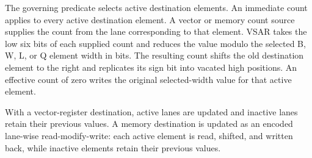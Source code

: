 The governing predicate selects active destination elements. An immediate
count applies to every active destination element. A vector or
memory count source supplies the count from the lane corresponding to that
element. VSAR takes the low six bits of each supplied count and reduces the
value modulo the selected B, W, L, or Q element width in bits. The resulting
count shifts the old destination element to the right and replicates its sign
bit into vacated high positions. An effective count of zero writes the original
selected-width value for that active element.

With a vector-register destination, active lanes are updated and inactive lanes
retain their previous values. A memory destination is updated as an encoded
lane-wise read-modify-write: each active element is read, shifted, and written
back, while inactive elements retain their previous values.
